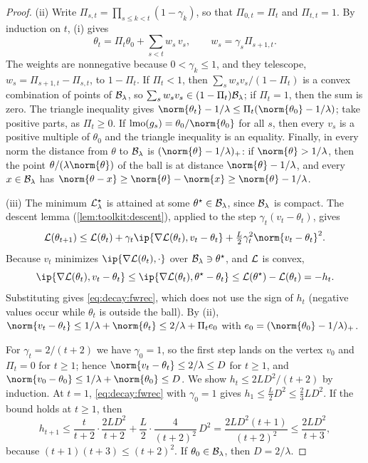 \begin{refsection}
\begin{proof}
(ii) Write $\Pi_{s,t}=\prod_{s\le k<t}(1-\gamma_k)$, so that $\Pi_{0,t}=\Pi_t$ and $\Pi_{t,t}=1$. By induction on $t$, (i) gives
\[
  \theta_t=\Pi_t\theta_0+\sum_{s<t}w_s\,v_s,\qquad w_s=\gamma_s\Pi_{s+1,t} .
\]
The weights are nonnegative because $0<\gamma_k\le1$, and they telescope, $w_s=\Pi_{s+1,t}-\Pi_{s,t}$, to $1-\Pi_t$. If $\Pi_t<1$, then $\sum_sw_sv_s/(1-\Pi_t)$ is a convex combination of points of $\mathcal{B}_\lambda$, so $\sum_sw_sv_s\in(1-\Pi_t)\mathcal{B}_\lambda$; if $\Pi_t=1$, then the sum is zero. The triangle inequality gives $\norm{\theta_t}-1/\lambda\le\Pi_t(\norm{\theta_0}-1/\lambda)$; take positive parts, as $\Pi_t\ge0$. If $\lmo(g_s)=\theta_0/\norm{\theta_0}$ for all $s$, then every $v_s$ is a positive multiple of $\theta_0$ and the triangle inequality is an equality. Finally, in every norm the distance from $\theta$ to $\mathcal{B}_\lambda$ is $(\norm{\theta}-1/\lambda)_+$: if $\norm{\theta}>1/\lambda$, then the point $\theta/(\lambda\norm{\theta})$ of the ball is at distance $\norm{\theta}-1/\lambda$, and every $x\in\mathcal{B}_\lambda$ has $\norm{\theta-x}\ge\norm{\theta}-\norm{x}\ge\norm{\theta}-1/\lambda$.

(iii) The minimum $\mathcal{L}^\star_\lambda$ is attained at some $\theta^\star\in\mathcal{B}_\lambda$, since $\mathcal{B}_\lambda$ is compact. The descent lemma (\cref{lem:toolkit:descent}), applied to the step $\gamma_t(v_t-\theta_t)$, gives
\[
  \Loss(\theta_{t+1})\le\Loss(\theta_t)+\gamma_t\ip{\nabla\Loss(\theta_t),v_t-\theta_t}+\tfrac L2\gamma_t^2\norm{v_t-\theta_t}^2 .
\]
Because $v_t$ minimizes $\ip{\nabla\Loss(\theta_t),\cdot}$ over $\mathcal{B}_\lambda\ni\theta^\star$, and $\mathcal{L}$ is convex,
\[
  \ip{\nabla\Loss(\theta_t),v_t-\theta_t}\le\ip{\nabla\Loss(\theta_t),\theta^\star-\theta_t}\le\Loss(\theta^\star)-\Loss(\theta_t)=-h_t .
\]
Substituting gives \eqref{eq:decay:fwrec}, which does not use the sign of $h_t$ (negative values occur while $\theta_t$ is outside the ball). By (ii), $\norm{v_t-\theta_t}\le1/\lambda+\norm{\theta_t}\le2/\lambda+\Pi_te_0$ with $e_0=(\norm{\theta_0}-1/\lambda)_+$.

For $\gamma_t=2/(t+2)$ we have $\gamma_0=1$, so the first step lands on the vertex $v_0$ and $\Pi_t=0$ for $t\ge1$; hence $\norm{v_t-\theta_t}\le2/\lambda\le D$ for $t\ge1$, and $\norm{v_0-\theta_0}\le1/\lambda+\norm{\theta_0}\le D$. We show $h_t\le2LD^2/(t+2)$ by induction. At $t=1$, \eqref{eq:decay:fwrec} with $\gamma_0=1$ gives $h_1\le\frac L2D^2\le\frac23LD^2$. If the bound holds at $t\ge1$, then
\[
  h_{t+1}\le\frac t{t+2}\cdot\frac{2LD^2}{t+2}+\frac L2\cdot\frac4{(t+2)^2}\,D^2=\frac{2LD^2(t+1)}{(t+2)^2}\le\frac{2LD^2}{t+3},
\]
because $(t+1)(t+3)\le(t+2)^2$. If $\theta_0\in\mathcal{B}_\lambda$, then $D=2/\lambda$.


\end{proof}
\end{refsection}

